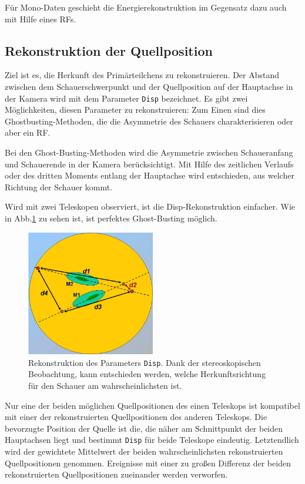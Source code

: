 Für Mono-Daten geschieht die Energierekonstruktion im Gegensatz dazu auch mit Hilfe eines RFs.


\subsection{Rekonstruktion der Quellposition}
Ziel ist es, die Herkunft des Primärteilchens zu rekonstruieren. 
Der Abstand zwischen dem Schauerschwerpunkt und der Quellposition auf der Hauptachse in der Kamera wird mit dem Parameter \texttt{Disp} bezeichnet.
Es gibt zwei Möglichkeiten, diesen Parameter zu rekonstruieren: Zum Einen sind dies Ghostbusting-Methoden, die die Asymmetrie des Schauers charakterisieren oder aber ein RF.

Bei den Ghost-Busting-Methoden wird die Asymmetrie zwischen Schaueranfang und Schauerende in der Kamera berücksichtigt.
Mit Hilfe des zeitlichen Verlaufs oder des dritten Moments entlang der Hauptachse wird entschieden, aus welcher Richtung der Schauer kommt.

Wird mit zwei Teleskopen observiert, ist die Disp-Rekonstruktion einfacher.
Wie in Abb.\ref{Disp} zu sehen ist, ist perfektes Ghost-Busting möglich.

\begin{figure}
    \centering
    \includegraphics[width=0.5\textwidth]{./Plots/04_MrkAnalyse/Disp.png}
    \caption{Rekonstruktion des Parameters \texttt{Disp}. Dank der stereoskopischen Beobachtung, kann entschieden werden, welche Herkunftsrichtung für den Schauer am wahrscheinlichsten ist.\cite{DispRekonstruktion}}
    \label{Disp}
\end{figure}

Nur eine der beiden möglichen Quellpositionen des einen Teleskops ist kompatibel mit einer der rekonstruierten Quellpositionen des anderen Teleskops. 
Die bevorzugte Position der Quelle ist die, die näher am Schnittpunkt der beiden Hauptachsen liegt und bestimmt \texttt{Disp} für beide Teleskope eindeutig.
Letztendlich wird der gewichtete Mittelwert der beiden wahrscheinlichsten rekonstruierten Quellpositionen genommen.
Ereignisse mit einer zu großen Differenz der beiden rekonstruierten Quellpositionen zueinander werden verworfen.



